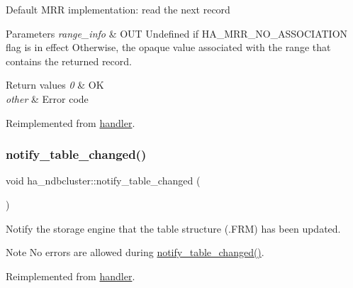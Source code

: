 Default M\+RR implementation\+: read the next record


\begin{DoxyParams}{Parameters}
{\em range\+\_\+info} & O\+UT Undefined if H\+A\+\_\+\+M\+R\+R\+\_\+\+N\+O\+\_\+\+A\+S\+S\+O\+C\+I\+A\+T\+I\+ON flag is in effect Otherwise, the opaque value associated with the range that contains the returned record.\\
\hline
\end{DoxyParams}

\begin{DoxyRetVals}{Return values}
{\em 0} & OK \\
\hline
{\em other} & Error code \\
\hline
\end{DoxyRetVals}


Reimplemented from \mbox{\hyperlink{classhandler_a3419071f3d4abf183dac95ef565adfff}{handler}}.

\mbox{\label{classha__ndbcluster_a2e656837653854c38ee70a7cb46515c6}} 
\subsubsection{\texorpdfstring{notify\+\_\+table\+\_\+changed()}{notify\_table\_changed()}}
{\footnotesize\ttfamily void ha\+\_\+ndbcluster\+::notify\+\_\+table\+\_\+changed (\begin{DoxyParamCaption}{ }\end{DoxyParamCaption})\hspace{0.3cm}{\ttfamily [virtual]}}

Notify the storage engine that the table structure (.F\+RM) has been updated.

\begin{DoxyNote}{Note}
No errors are allowed during \mbox{\hyperlink{classha__ndbcluster_a2e656837653854c38ee70a7cb46515c6}{notify\+\_\+table\+\_\+changed()}}. 
\end{DoxyNote}


Reimplemented from \mbox{\hyperlink{classhandler_a26aaaf2105e60ca590b79fae82e48960}{handler}}.

\mbox{\label{classha__ndbcluster_a6aaba12f45b013e5dc180f40463e802a}} 
